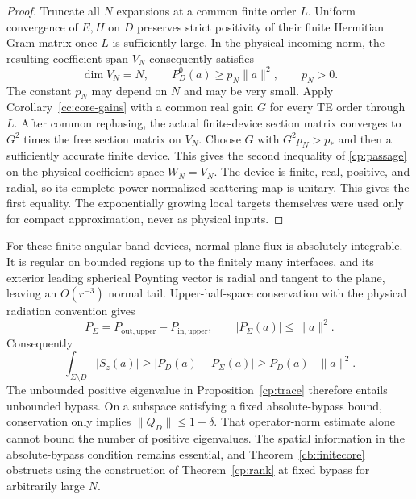 \begin{proof}
Truncate all $N$ expansions at a common finite order $L$.
Uniform convergence of $E,H$ on $D$ preserves strict positivity
of their finite Hermitian Gram matrix once $L$ is sufficiently
large. In the physical incoming norm, the resulting coefficient
span $V_N$ consequently satisfies
\[
 \dim V_N=N,\qquad P_D^0(a)\geq p_N\|a\|^2,
 \qquad p_N>0.
\]
The constant $p_N$ may depend on $N$ and may be very small.
Apply Corollary~\ref{cc:core-gains} with a common real gain $G$
for every TE order through $L$. After common rephasing, the
actual finite-device section matrix converges to $G^2$ times
the free section matrix on $V_N$. Choose $G$ with
$G^2p_N>p_*$ and then a sufficiently accurate finite device.
This gives the second inequality of \eqref{cp:passage} on the
physical coefficient space $W_N=V_N$.
The device is finite, real, positive, and radial, so its complete
power-normalized scattering map is unitary. This gives the first
equality. The exponentially growing local targets themselves were
used only for compact approximation, never as physical inputs.
\end{proof}

\begin{remark}
\label{cp:bypass}
For these finite angular-band devices, normal plane flux is absolutely
integrable. It is regular on bounded regions up to the finitely many
interfaces, and its exterior leading spherical Poynting vector is
radial and tangent to the plane, leaving an $O(r^{-3})$ normal tail.
Upper-half-space conservation with the physical radiation convention
gives
\[
 P_\Sigma=P_{\mathrm{out,upper}}-P_{\mathrm{in,upper}},
 \qquad |P_\Sigma(a)|\leq\|a\|^2.
\]
Consequently
\begin{equation}\label{cp:returncost}
 \int_{\Sigma\setminus D}|S_z(a)|
       \geq |P_D(a)-P_\Sigma(a)|
       \geq P_D(a)-\|a\|^2.
\end{equation}
The unbounded positive eigenvalue in Proposition~\ref{cp:trace}
therefore entails unbounded bypass. On a subspace satisfying a fixed
absolute-bypass bound, conservation only implies
$\|Q_D\|\leq1+\delta$. That operator-norm estimate alone cannot
bound the number of positive eigenvalues. The spatial information
in the absolute-bypass condition remains essential, and
Theorem~\ref{cb:finitecore} obstructs using the construction of
Theorem~\ref{cp:rank} at fixed bypass for arbitrarily large $N$.
\end{remark}
